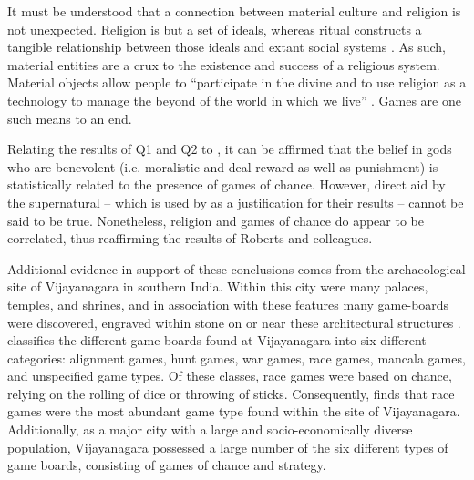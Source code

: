 It must be understood that a connection between material culture and religion is not unexpected. Religion is but a set of ideals, whereas ritual constructs a tangible relationship between those ideals and extant social systems \parencite[14]{bell1992}. As such, material entities are a crux to the existence and success of a religious system. Material objects allow people to ``participate in the divine and to use religion as a technology to manage the beyond of the world in which we live” \parencite[99]{hodder2016}. Games are one such means to an end. 

Relating the results of Q1 and Q2 to \textcite{roberts1959}, it can be affirmed that the belief in gods who are benevolent (i.e. moralistic and deal reward as well as punishment) is statistically related to the presence of games of chance. However, direct aid by the supernatural – which is used by \textcite[602]{roberts1959} as a justification for their results – cannot be said to be true. Nonetheless, religion and games of chance do appear to be correlated, thus reaffirming the results of Roberts and colleagues.

Additional evidence in support of these conclusions comes from the archaeological site of Vijayanagara in southern India. Within this city were many palaces, temples, and shrines, and in association with these features many game-boards were discovered, engraved within stone on or near these architectural structures \parencite[462-463]{rogersdotter2015}. \textcite{rogersdotter2015} classifies the different game-boards found at Vijayanagara into six different categories: alignment games, hunt games, war games, race games, mancala games, and unspecified game types. Of these classes, race games were based on chance, relying on the rolling of dice or throwing of sticks. Consequently, \textcite{rogersdotter2015} finds that race games were the most abundant game type found within the site of Vijayanagara. Additionally, as a major city with a large and socio-economically diverse population, Vijayanagara possessed a large number of the six different types of game boards, consisting of games of chance and strategy. 

